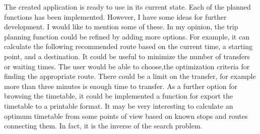 The created application is ready to use in its current state. Each of the planned functions has been implemented. However, I have some ideas for further development. I would like to mention some of these. In my opinion, the trip planning function could be refined by adding more options. For example, it can calculate the following recommended route based on the current time, a starting point, and a destination. It could be useful to minimize the number of transfers or waiting times. The user would be able to choose,the optimization criteria for finding the appropriate route. There could be a limit on the transfer, for example more than three minutes is enough time to transfer. As a further option for browsing the timetable, it could be implemented a function for export the timetable to a printable format. It may be very interesting to calculate an optimum timetable from some points of view based on known stops and routes connecting them. In fact, it is the inverse of the search problem.
